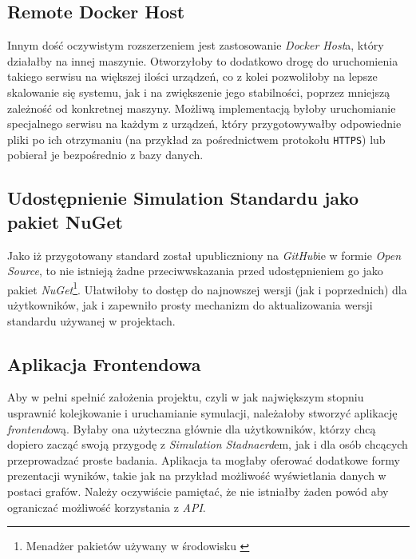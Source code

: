 \subsection{Remote Docker Host}

\par Innym dość oczywistym rozszerzeniem jest zastosowanie \emph{Docker Host}a, który działałby na innej maszynie. Otworzyłoby to dodatkowo drogę do uruchomienia takiego serwisu na większej ilości urządzeń, co z kolei pozwoliłoby na lepsze skalowanie się systemu, jak i na zwiększenie jego stabilności, poprzez mniejszą zależność od konkretnej maszyny. Możliwą implementacją byłoby uruchomianie specjalnego serwisu na każdym z urządzeń, który przygotowywałby odpowiednie pliki po ich otrzymaniu (na przykład za pośrednictwem protokołu \texttt{HTTPS}) lub pobierał je bezpośrednio z bazy danych.

\subsection{Udostępnienie Simulation Standardu jako pakiet NuGet}

\par Jako iż przygotowany standard został upubliczniony na \emph{GitHub}ie w formie \emph{Open Source}, to nie istnieją żadne przeciwwskazania przed udostępnieniem go jako pakiet \emph{NuGet}\footnote{Menadżer pakietów używany w środowisku \emph{\dotnet{}}}. Ułatwiłoby to dostęp do najnowszej wersji (jak i poprzednich) dla użytkowników, jak i zapewniło prosty mechanizm do aktualizowania wersji standardu używanej w projektach.

\subsection{Aplikacja Frontendowa}

\par Aby w pełni spełnić założenia projektu, czyli w jak największym stopniu usprawnić kolejkowanie i uruchamianie symulacji, należałoby stworzyć aplikację \emph{frontend}ową. Byłaby ona użyteczna głównie dla użytkowników, którzy chcą dopiero zacząć swoją przygodę z \emph{Simulation Stadnaerd}em, jak i dla osób chcących przeprowadzać proste badania. Aplikacja ta mogłaby oferować dodatkowe formy prezentacji wyników, takie jak na przykład możliwość wyświetlania danych w postaci grafów. Należy oczywiście pamiętać, że nie istniałby żaden powód aby ograniczać możliwość korzystania z \emph{API}.